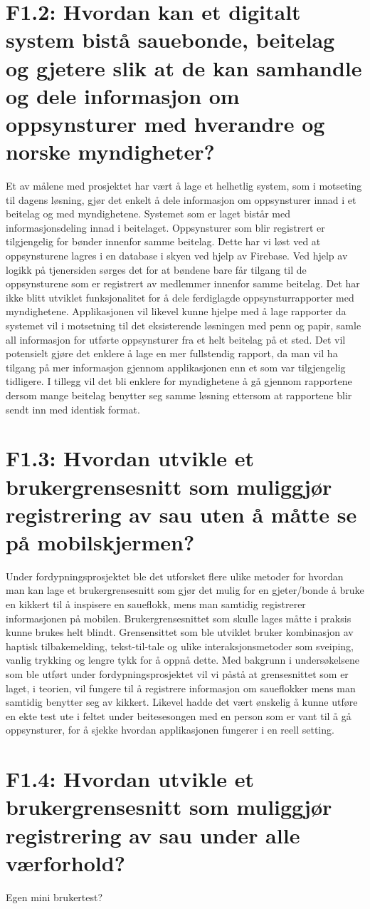 \section{F1.2: Hvordan kan et digitalt system bistå sauebonde, beitelag og gjetere slik at de kan samhandle og dele informasjon om oppsynsturer med hverandre og norske myndigheter?}
Et av målene med prosjektet har vært å lage et helhetlig system, som i motseting til dagens løsning, gjør det enkelt å dele informasjon om oppsynsturer innad i et beitelag og med myndighetene. Systemet som er laget bistår med informasjonsdeling innad i beitelaget. Oppsynsturer som blir registrert er tilgjengelig for bønder innenfor samme beitelag. Dette har vi løst ved at oppsynsturene lagres i en database i skyen ved hjelp av Firebase. Ved hjelp av logikk på tjenersiden sørges det for at bøndene bare får tilgang til de oppsynsturene som er registrert av medlemmer innenfor samme beitelag.
\newline
\newline
\noindent
Det har ikke blitt utviklet funksjonalitet for å dele ferdiglagde oppsynsturrapporter med myndighetene. Applikasjonen vil likevel kunne hjelpe med å lage rapporter da systemet vil i motsetning til det eksisterende løsningen med penn og papir, samle all informasjon for utførte oppsynsturer fra et helt beitelag på et sted. Det vil potensielt gjøre det enklere å lage en mer fullstendig rapport, da man vil ha tilgang på mer informasjon gjennom applikasjonen enn et som var tilgjengelig tidligere. I tillegg vil det bli enklere for myndighetene å gå gjennom rapportene dersom mange beitelag benytter seg samme løsning ettersom at rapportene blir sendt inn med identisk format. 

\section{F1.3: Hvordan utvikle et brukergrensesnitt som muliggjør registrering av sau uten å måtte se på mobilskjermen?}
Under fordypningsprosjektet ble det utforsket flere ulike metoder for hvordan man kan lage et brukergrensesnitt som gjør det mulig for en gjeter/bonde å bruke en kikkert til å inspisere en saueflokk, mens man samtidig registrerer informasjonen på mobilen. Brukergrensesnittet som skulle lages måtte i praksis kunne brukes helt blindt. Grensensittet som ble utviklet bruker kombinasjon av haptisk tilbakemelding, tekst-til-tale og ulike interaksjonsmetoder som sveiping, vanlig trykking og lengre tykk for å oppnå dette. Med bakgrunn i undersøkelsene som ble utført under fordypningsprosjektet \cite{Abtahi2020TilsynBeite} vil vi påstå at grensesnittet som er laget, i teorien, vil fungere til å registrere informasjon om saueflokker mens man samtidig benytter seg av kikkert. Likevel hadde det vært ønskelig å kunne utføre en ekte test ute i feltet under beitesesongen med en person som er vant til å gå oppsynsturer, for å sjekke hvordan applikasjonen fungerer i en reell setting.

\section{F1.4: Hvordan utvikle et brukergrensesnitt som muliggjør registrering av sau under alle værforhold?}
Egen mini brukertest? 